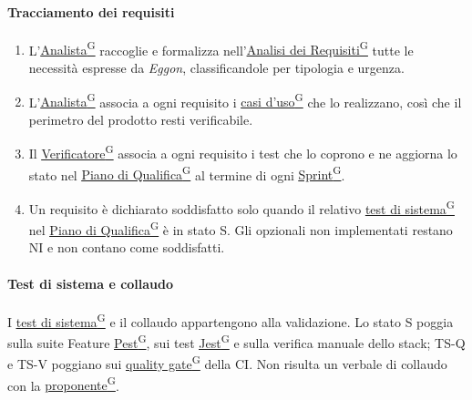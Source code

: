 \documentclass[a4paper,12pt]{article}
\providecommand{\glslink}[2]{\href{https://alittlebyte-19.github.io/Documentazione/glossario.html\#gls-#1}{\underline{#2}\textsuperscript{\scriptsize G}}}
\begin{document}
\paragraph{Tracciamento dei requisiti}
\begin{enumerate}
    \item L'\glslink{analista}{Analista} raccoglie e formalizza nell'\glslink{analisi-dei-requisiti-adr}{Analisi dei Requisiti} tutte le necessità espresse da \textit{Eggon}, classificandole per tipologia e urgenza.
    \item L'\glslink{analista}{Analista} associa a ogni requisito i \glslink{caso-d-uso-uc}{casi d'uso} che lo realizzano, così che il perimetro del prodotto resti verificabile.
    \item Il \glslink{verificatore}{Verificatore} associa a ogni requisito i test che lo coprono e ne aggiorna lo stato nel \glslink{piano-di-qualifica}{Piano di Qualifica} al termine di ogni \glslink{sprint}{Sprint}.
    \item Un requisito è dichiarato soddisfatto solo quando il relativo \glslink{test-di-sistema}{test di sistema} nel \glslink{piano-di-qualifica}{Piano di Qualifica} è in stato S. Gli opzionali non implementati restano NI e non contano come soddisfatti.
\end{enumerate}

\paragraph{Test di sistema e collaudo}
I \glslink{test-di-sistema}{test di sistema} e il collaudo appartengono alla validazione. Lo stato S poggia sulla suite Feature \glslink{pest}{Pest}, sui test \glslink{jest}{Jest} e sulla verifica manuale dello stack; TS-Q e TS-V poggiano sui \glslink{quality-gate}{quality gate} della CI. Non risulta un verbale di collaudo con la \glslink{committente-proponente}{proponente}.
\end{document}
